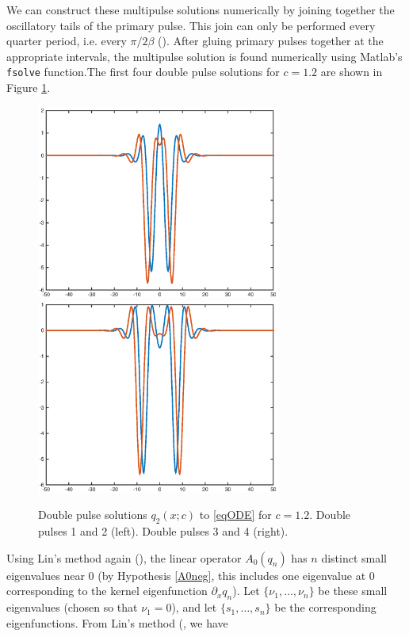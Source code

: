 \documentclass[12pt]{article}
\begin{document}
We can construct these multipulse solutions numerically by joining together the oscillatory tails of the primary pulse. This join can only be performed every quarter period, i.e. every $\pi / 2 \beta$ (\cite{Sandstede1997}). After gluing primary pulses together at the appropriate intervals, the multipulse solution is found numerically using Matlab's \texttt{fsolve} function.The first four double pulse solutions for $c = 1.2$ are shown in Figure \ref{fig:double}.

\begin{figure}[H]
\label{fig:double}
\centering
\includegraphics[width=8cm]{double12_12.eps}
\includegraphics[width=8cm]{double12_34.eps}
\caption{Double pulse solutions $q_2(x; c)$ to \eqref{eqODE} for $c = 1.2$. Double pulses 1 and 2 (left). Double pulses 3 and 4 (right).}
\end{figure}

Using Lin's method again (\cite{Sandstede1998}), the linear operator $A_0(q_n)$ has $n$ distinct small eigenvalues near 0 (by Hypothesis \ref{A0neg}, this includes one eigenvalue at 0 corresponding to the kernel eigenfunction $\partial_x q_n$). Let $\{\nu_1, \dots, \nu_n\}$ be these small eigenvalues (chosen so that $\nu_1 = 0$), and let $\{s_1, \dots, s_n \}$ be the corresponding eigenfunctions. From Lin's method (\cite{Sandstede1998}, we have
\end{document}
